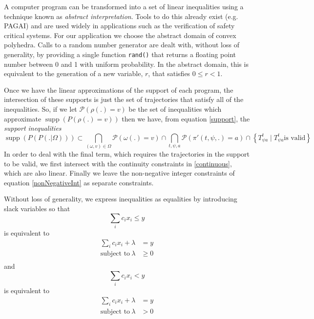 \documentclass{article}
\DeclareMathOperator\supp{supp}
\begin{document}
A computer program can be transformed into a set of linear inequalities using a technique known as \textit{abstract interpretation}\cite{cousot1977abstract}. Tools to do this already exist (e.g. PAGAI\cite{henry2012pagai}) and are used widely in applications such as the verification of safety critical systems\cite{blanchet2003static}. For our application we choose the abstract domain of convex polyhedra\cite{cousot1978automatic}\cite{becchi2018efficient}. Calls to a random number generator are dealt with, without loss of generality, by providing a single function \texttt{rand()} that returns a floating point number between 0 and 1 with uniform probability. In the abstract domain, this is equivalent to the generation of a new variable, $r$, that satisfies $0 \le r < 1$.

Once we have the linear approximations of the support of each program, the intersection of these supports is just the set of trajectories that satisfy all of the inequalities. So, if we let $\mathcal{P}(\rho(.)=v)$ be the set of inequalities which approximate $\supp(P(\rho(.)=v))$ then we have, from equation \ref{support}, the \textit{support inequalities}
\begin{equation}
\supp(P(P(.|\Omega))) \subset
\bigcap_{(\omega,v) \in \Omega}  \mathcal{P}(\omega(.) = v) \cap
\bigcap_{t, \psi, a} \mathcal{P}(\pi'(t,\psi,.)=a) \cap
\left\{T^t_{\psi a} \mid T^t_{\psi a} \text{is valid}\right\}
\label{linearSupport}
\end{equation}
In order to deal with the final term, which requires the trajectories in the support to be valid, we first intersect with the continuity constraints in \ref{continuous}, which are also linear. Finally we leave the non-negative integer constraints of equation \ref{nonNegativeInt} as separate constraints.

Without loss of generality, we express inequalities as equalities by introducing slack variables so that
\[
\sum_i c_i x_i \le y
\]
is equivalent to
\[
\begin{split}
 \sum_i c_i x_i + \lambda & = y \\
\text{subject to}\ \lambda & \ge 0 \\
\end{split}
\]
and
\[
\sum_i c_i x_i < y
\]
is equivalent to
\[
\begin{split}
 \sum_i c_i x_i + \lambda & = y \\
\text{subject to}\ \lambda & > 0 \\
\end{split}
\]
\end{document}
